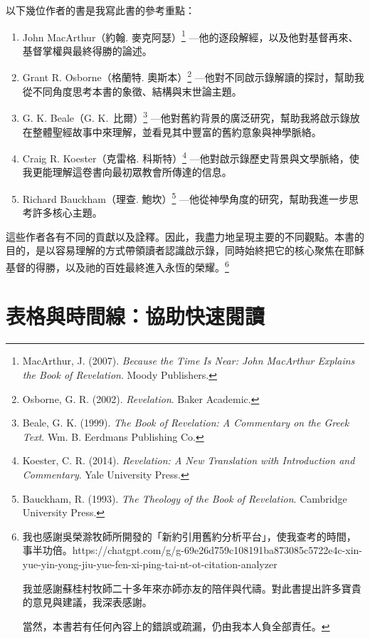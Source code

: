 以下幾位作者的書是我寫此書的參考重點：
\begin{enumerate}
\item John MacArthur（約翰. 麥克阿瑟）{\footnotesize\footnote{MacArthur, J. (2007). \textit{Because the Time Is Near: John MacArthur Explains the Book of Revelation}. Moody Publishers.}} —他的逐段解經，以及他對基督再來、基督掌權與最終得勝的論述。

\item Grant R. Osborne（格蘭特. 奧斯本）\footnote{Osborne, G. R. (2002). \textit{Revelation}. Baker Academic.} —他對不同啟示錄解讀的探討，幫助我從不同角度思考本書的象徵、結構與末世論主題。
    
\item G. K. Beale（G. K.\ 比爾）\footnote{Beale, G. K. (1999). \textit{The Book of Revelation: A Commentary on the Greek Text}. Wm. B. Eerdmans Publishing Co.} —他對舊約背景的廣泛研究，幫助我將啟示錄放在整體聖經故事中來理解，並看見其中豐富的舊約意象與神學脈絡。
    
\item Craig R. Koester（克雷格. 科斯特）\footnote{Koester, C. R. (2014). \textit{Revelation: A New Translation with Introduction and Commentary}. Yale University Press.} —他對啟示錄歷史背景與文學脈絡，使我更能理解這卷書向最初眾教會所傳達的信息。
    
\item Richard Bauckham（理查. 鮑坎）\footnote{Bauckham, R. (1993). \textit{The Theology of the Book of Revelation}. Cambridge University Press.} 
—他從神學角度的研究，幫助我進一步思考許多核心主題。
\end{enumerate}

這些作者各有不同的貢獻以及詮釋。因此，我盡力地呈現主要的不同觀點。本書的目的，是以容易理解的方式帶領讀者認識啟示錄，同時始終把它的核心聚焦在耶穌基督的得勝，以及祂的百姓最終進入永恆的榮耀。\footnote{
我也感謝吳榮滁牧師所開發的「新約引用舊約分析平台」，使我查考的時間，事半功倍。https://chatgpt.com/g/g-69e26d759c108191ba873085c5722e4c-xin-yue-yin-yong-jiu-yue-fen-xi-ping-tai-nt-ot-citation-analyzer

我並感謝蘇桂村牧師二十多年來亦師亦友的陪伴與代禱。對此書提出許多寶貴的意見與建議，我深表感謝。

當然，本書若有任何內容上的錯誤或疏漏，仍由我本人負全部責任。
}

\section*{表格與時間線：協助快速閱讀}

